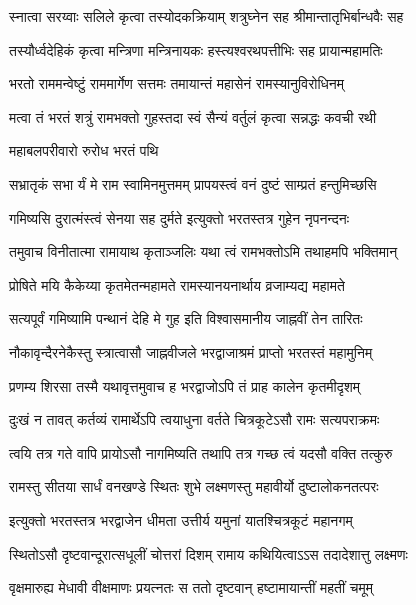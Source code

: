 \twolineshloka
{स्नात्वा सरय्वाः सलिले कृत्वा तस्योदकक्रियाम्}
{शत्रुघ्नेन सह श्रीमान्तातृभिर्बान्धवैः सह} %

\twolineshloka
{तस्यौर्ध्वदेहिकं कृत्वा मन्त्रिणा मन्त्रिनायकः}
{हस्त्यश्वरथपत्तीभिः सह प्रायान्महामतिः} %

\twolineshloka
{भरतो राममन्वेष्टुं राममार्गेण सत्तमः}
{तमायान्तं महासेनं रामस्यानुविरोधिनम्} %

\twolineshloka
{मत्वा तं भरतं शत्रुं रामभक्तो गुहस्तदा}
{स्वं सैन्यं वर्तुलं कृत्वा सन्नद्धः कवची रथी} %

\onelineshloka
{महाबलपरीवारो रुरोध भरतं पथि} %

\twolineshloka
{सभ्रातृकं सभा र्यं मे राम स्वामिनमुत्तमम्}
{प्रापयस्त्वं वनं दुष्टं साम्प्रतं हन्तुमिच्छसि} %

\twolineshloka
{गमिष्यसि दुरात्मंस्त्वं सेनया सह दुर्मते}
{इत्युक्तो भरतस्तत्र गुहेन नृपनन्दनः} %

\twolineshloka
{तमुवाच विनीतात्मा रामायाथ कृताञ्जलिः}
{यथा त्वं रामभक्तोऽमि तथाहमपि भक्तिमान्} %

\twolineshloka
{प्रोषिते मयि कैकेय्या कृतमेतन्महामते}
{रामस्यानयनार्थाय व्रजाम्यद्य महामते} %

\twolineshloka
{सत्यपूर्वं गमिष्यामि पन्थानं देहि मे गुह}
{इति विश्वासमानीय जाह्नवीं तेन तारितः} %

\twolineshloka
{नौकावृन्दैरनेकैस्तु स्त्रात्वासौ जाह्नवीजले}
{भरद्वाजाश्रमं प्राप्तो भरतस्तं महामुनिम्} %

\twolineshloka
{प्रणम्य शिरसा तस्मै यथावृत्तमुवाच ह}
{भरद्वाजोऽपि तं प्राह कालेन कृतमीदृशम्} %

\twolineshloka
{दुःखं न तावत् कर्तव्यं रामार्थेऽपि त्वयाधुना}
{वर्तते चित्रकूटेऽसौ रामः सत्यपराक्रमः} %

\twolineshloka
{त्वयि तत्र गते वापि प्रायोऽसौ नागमिष्यति}
{तथापि तत्र गच्छ त्वं यदसौ वक्ति तत्कुरु} %

\twolineshloka
{रामस्तु सीतया सार्धं वनखण्डे स्थितः शुभे}
{लक्ष्मणस्तु महावीर्यो दुष्टालोकनतत्परः} %

\twolineshloka
{इत्युक्तो भरतस्तत्र भरद्वाजेन धीमता}
{उत्तीर्य यमुनां यातश्चित्रकूटं महानगम्} %

\twolineshloka
{स्थितोऽसौ दृष्टवान्दूरात्सधूलीं चोत्तरां दिशम्}
{रामाय कथियित्वाऽऽस तदादेशात्तु लक्ष्मणः} %

\twolineshloka
{वृक्षमारुह्य मेधावी वीक्षमाणः प्रयत्नतः}
{स ततो दृष्टवान् हष्टामायान्तीं महतीं चमूम्} %

